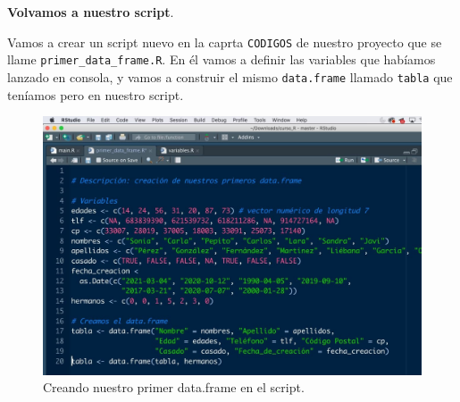 \documentclass[11pt,]{book}
\begin{document}
\textbf{Volvamos a nuestro script}.

Vamos a crear un script nuevo en la caprta \texttt{CODIGOS} de nuestro proyecto que se llame \texttt{primer\_data\_frame.R}. En él vamos a definir las variables que habíamos lanzado en consola, y vamos a construir el mismo \texttt{data.frame} llamado \texttt{tabla} que teníamos pero en nuestro script.

\begin{figure}

{\centering \includegraphics[width=0.5\linewidth]{./img/codigo_primer_data_frame} 

}

\caption{Creando nuestro primer data.frame en el script.}\label{fig:codigo-primer-data-frame}
\end{figure}
\end{document}
